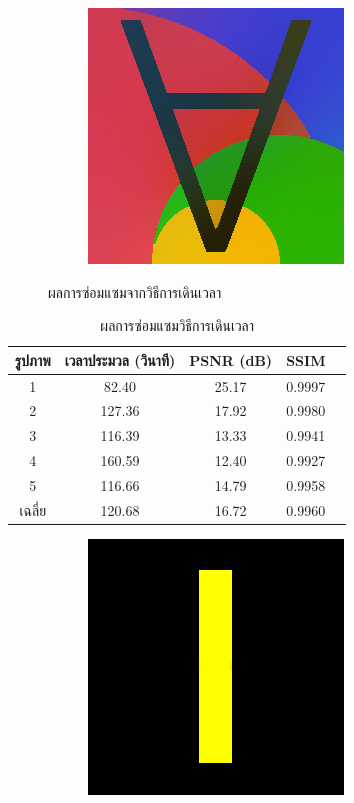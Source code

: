 \documentclass[hidelinks, a4paper,12pt]{article}
\numberwithin{equation}{section}							%
\numberwithin{equation}{section}
\begin{document}
{\begin{figure}[H]
\begin{subfigure}{0.4\linewidth}
			\includegraphics[width=0.8\linewidth]{images/result_ex1/timemarch05.png}			
		\end{subfigure}
		\caption{ผลการซ่อมแซมจากวิธีการเดินเวลา}
	\end{figure}
\begin{table}[H]
	\centering
	\begin{tabular}[ht]{|c|c|c|c|c|}
		\hline
		รูปภาพ &เวลาประมวล  (วินาที) & PSNR (dB) & SSIM \\
		\hline
		1 & 82.40 & 25.17 & 0.9997 \\ 
		2 & 127.36 & 17.92 & 0.9980 \\
		3 &  116.39 & 13.33 & 0.9941 \\
		4 & 160.59  &12.40  & 0.9927 \\
		5 & 116.66  & 14.79  & 0.9958 \\
		\hline
		เฉลี่ย & 120.68  & 16.72  & 0.9960 \\
		\hline
	\end{tabular}
	\caption{ผลการซ่อมแซมวิธีการเดินเวลา}
\end{table}	
\begin{figure}[H]
	\centering
	\begin{subfigure}{0.4\linewidth}
		\centering
		\includegraphics[width=0.8\linewidth]{images/result_ex1/fixpoint01.png}

\end{subfigure}
\end{figure}}
\end{document}
